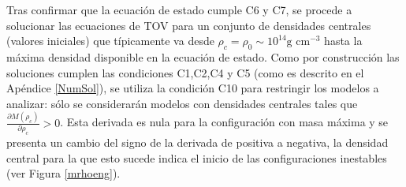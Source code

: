 Tras confirmar que la ecuación de estado cumple C6 y C7, se procede a solucionar las ecuaciones de TOV para un conjunto de densidades centrales (valores iniciales) que típicamente va desde $\rho_c=\rho_0 \sim 10^{14} \text{g cm}^{-3}$ hasta la máxima densidad disponible en la ecuación de estado. Como por construcción las soluciones cumplen las condiciones C1,C2,C4 y C5 (como es descrito en el Apéndice \ref{NumSol}), se utiliza la condición C10 para restringir los modelos a analizar: sólo se considerarán modelos con densidades centrales tales que $\frac { \partial M \left( \rho _ { c } \right) } { \partial \rho _ { c } } > 0$. Esta derivada es nula para la configuración con masa máxima y se presenta un cambio del signo de la derivada de positiva a negativa, la densidad central para la que esto sucede indica el inicio de las configuraciones inestables (ver Figura \ref{mrhoeng}).

